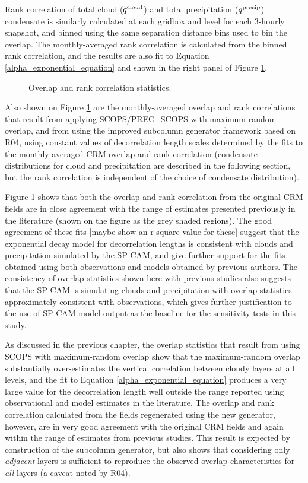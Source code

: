 Rank correlation of total cloud ($q^{\rm cloud}$) and total precipitation ($q^{\rm precip}$) condensate is similarly calculated at each gridbox and level for each 3-hourly snapshot, and binned using the same separation distance bins used to bin the overlap. The monthly-averaged rank correlation is calculated from the binned rank correlation, and the results are also fit to Equation \ref{alpha_exponential_equation} and shown in the right panel of Figure \ref{overlap_rankcorr}. 

\begin{figure}
\caption{Overlap and rank correlation statistics.}
\label{overlap_rankcorr}
\end{figure}

Also shown on Figure \ref{overlap_rankcorr} are the monthly-averaged overlap and rank correlations that result from applying SCOPS/PREC\_SCOPS with maximum-random overlap, and from using the improved subcolumn generator framework based on R04, using constant values of decorrelation length scales determined by the fits to the monthly-averaged CRM overlap and rank correlation (condensate distributions for cloud and precipitation are described in the following section, but the rank correlation is independent of the choice of condensate distribution).

Figure \ref{overlap_rankcorr} shows that both the overlap and rank correlation from the original CRM fields are in close agreement with the range of estimates presented previously in the literature (shown on the figure as the grey shaded regions). The good agreement of these fits [maybe show an r-square value for these] suggest that the exponential decay model for decorrelation lengths is consistent with clouds and precipitation simulated by the SP-CAM, and give further support for the fits obtained using both observations and models obtained by previous authors. The consistency of overlap statistics shown here with previous studies also suggests that the SP-CAM is simulating clouds and precipitation with overlap statistics approximately consistent with observations, which gives further justification to the use of SP-CAM model output as the baseline for the sensitivity tests in this study.

As discussed in the previous chapter, the overlap statistics that result from using SCOPS with maximum-random overlap show that the maximum-random overlap substantially over-estimates the vertical correlation between cloudy layers at all levels, and the fit to Equation \ref{alpha_exponential_equation} produces a very large value for the decorrelation length well outside the range reported using observational and model estimates in the literature. The overlap and rank correlation calculated from the fields regenerated using the new generator, however, are in very good agreement with the original CRM fields and again within the range of estimates from previous studies. This result is expected by construction of the subcolumn generator, but also shows that considering only \emph{adjacent} layers is sufficient to reproduce the observed overlap characteristics for \emph{all} layers (a caveat noted by R04).

